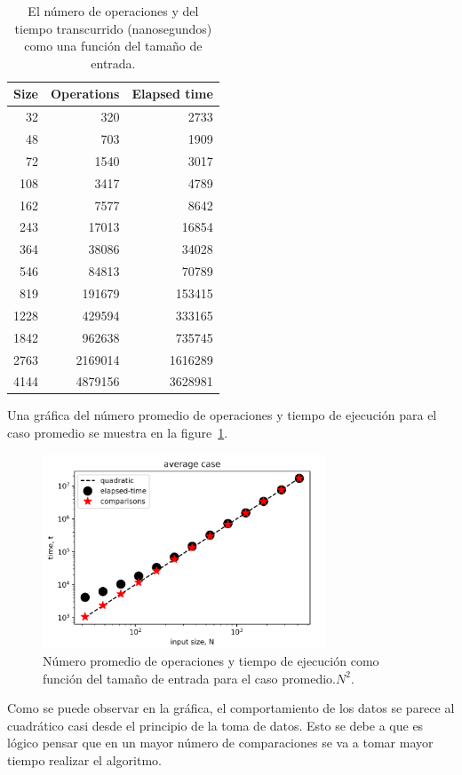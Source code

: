 \begin{table}[H]	%
	\centering	%
	\caption{
		El número de operaciones y del tiempo transcurrido (nanosegundos) como una función del tamaño de entrada.
	}	%

	\begin{tabular}{r r r}
		Size & Operations & Elapsed time \\
		\hline
		32 & 320 &  2733 \\
		48 & 703 &  1909 \\
		72& 1540 &  3017 \\
		108& 3417 & 4789 \\
		162& 7577&  8642 \\
	    243 & 17013 & 16854 \\
	    364 & 38086 & 34028 \\
	    546 & 84813 & 70789 \\
	    819 & 191679 & 153415 \\
	    1228 & 429594 & 333165 \\
	    1842 & 962638 & 735745 \\
	    2763 & 2169014 & 1616289 \\
	    4144 & 4879156 & 3628981 \\
	        
	\end{tabular}

\end{table}


Una gráfica del número promedio de operaciones y tiempo de ejecución para el caso promedio se muestra en la figure~\ref{fig:best}.

\begin{figure}[H]
	\centering
	\includegraphics[keepaspectratio, width = 0.75\textwidth]{averagec.png}
	\caption{
		Número promedio de operaciones y tiempo de ejecución como función del tamaño de entrada para el caso promedio.$N^2$.
	}
	\label{fig:best}
\end{figure}
Como se puede observar en la gráfica, el comportamiento de los datos se parece al cuadrático casi desde el principio de la toma de datos. Esto se debe a que es lógico pensar que en un mayor número de comparaciones se va a tomar mayor tiempo realizar el algoritmo. 

